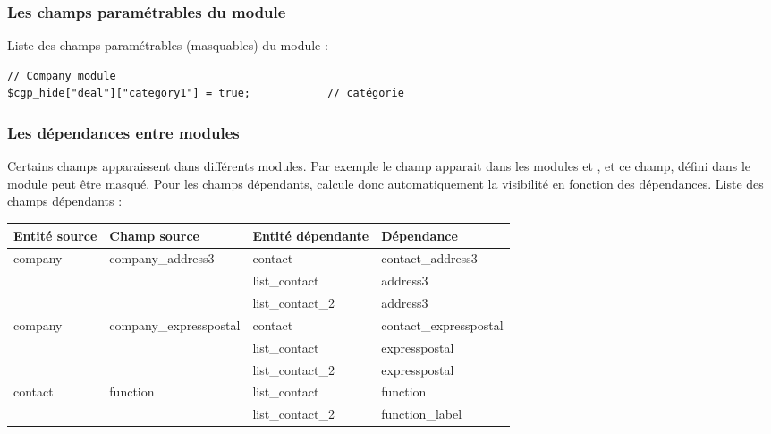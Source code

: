 \subsubsection{Les champs paramétrables du module \deal}

Liste des champs paramétrables (masquables) du module \deal :

\begin{verbatim}
// Company module
$cgp_hide["deal"]["category1"] = true;            // catégorie
\end{verbatim}  


\subsubsection{Les dépendances entre modules}

Certains champs apparaissent dans différents modules.
Par exemple le champ  apparait dans les modules \contact et \List, et ce champ, défini dans le module \contact peut être masqué.
Pour les champs dépendants, \obm calcule donc automatiquement la visibilité en fonction des dépendances.
Liste des champs dépendants :\\

\begin{tabular}{|p{2.5cm}|p{3.5cm}|p{2.5cm}|p{3.5cm}|}
\hline
\textbf{Entité source} & \textbf{Champ source} & \textbf{Entité dépendante} & \textbf{Dépendance} \\
\hline
\multirow{3}{2cm}{company} & \multirow{3}{2cm}{company\_address3} & contact & contact\_address3 \\ 
\cline{3-4}
& & list\_contact & address3 \\ 
\cline{3-4}
& & list\_contact\_2 & address3 \\ 
\hline
\multirow{3}{2cm}{company} & \multirow{3}{2cm}{company\_expresspostal} & contact & contact\_expresspostal \\ 
\cline{3-4}
& & list\_contact & expresspostal \\ 
\cline{3-4}
& & list\_contact\_2 & expresspostal \\ 
\hline
\multirow{2}{2cm}{contact} & \multirow{2}{2cm}{function} & list\_contact & function \\ 
\cline{3-4}
& & list\_contact\_2 & function\_label \\ 
\hline
\end{tabular}

